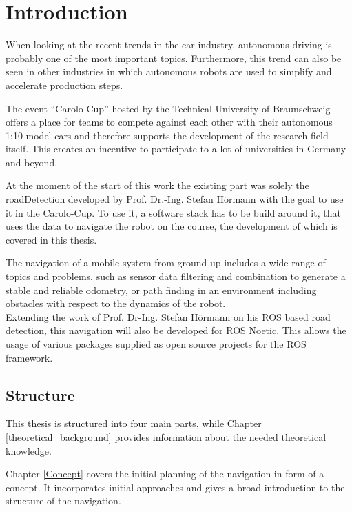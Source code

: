 \chapter{Introduction}
\label{introduction}

When looking at the recent trends in the car industry, autonomous driving is probably one of the most important topics. Furthermore, this trend can also be seen in other industries  in which autonomous robots are used to simplify and accelerate production steps. 



The event ``Carolo-Cup'' hosted by the Technical University of Braunschweig offers a place for teams to compete against each other with their autonomous 1:10 model cars and therefore supports the development of the research field itself. This creates an incentive to participate to a lot of universities in Germany and beyond.\\

At the moment of the start of this work the existing part was solely the roadDetection developed by Prof. Dr.-Ing. Stefan Hörmann with the goal to use it in the Carolo-Cup. To use it, a software stack has to be build around it, that uses the data to navigate the robot on the course, the development of which is covered in this thesis.


The navigation of a mobile system from ground up includes a wide range of topics and problems, such as sensor data filtering and combination to generate a stable and reliable odometry, or path finding in an environment including obstacles with respect to the dynamics of the robot.\\

Extending the work of Prof. Dr-Ing. Stefan Hörmann on his ROS based road detection, this navigation will also be developed for ROS Noetic. This allows the usage of various packages supplied as open source projects for the ROS framework.

\section{Structure}

This thesis is structured into four main parts, while Chapter \ref{theoretical_background} provides information about the needed theoretical knowledge.


Chapter \ref{Concept} covers the initial planning of the navigation in form of a concept. It incorporates initial approaches and gives a broad introduction to the structure of the navigation.\\

